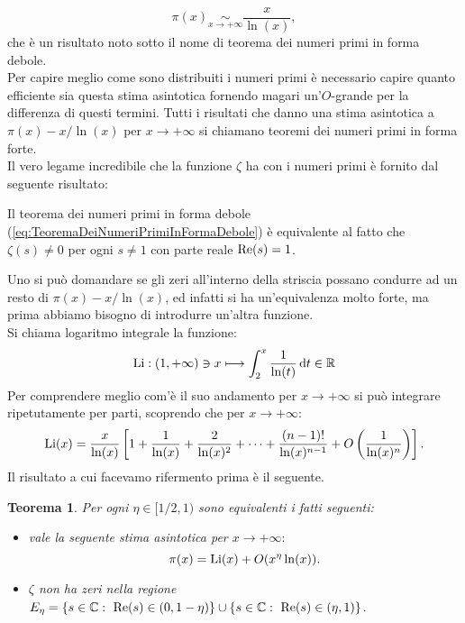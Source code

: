 \documentclass[11pt]{book}
\theoremstyle{Definizione}
\theoremstyle{TeoremaProposizioneLemmaCorollarioCongettura}
\newtheorem{myteo}{Teorema}[section]
\theoremstyle{OsservazioneNotaEsempio}
\newcommand{\R}{\mathbb{R}}
\newcommand{\C}{\mathbb{C}}
\renewcommand{\Re}{\textup{Re}}
\renewcommand{\d}{\mathrm{d}}
\newcommand{\dt}{\,\d t}
\begin{document}
\begin{equation}\label{eq:TeoremaDeiNumeriPrimiInFormaDebole}
\pi(x) \underset{x \to +\infty}{\sim} \frac{x}{\ln(x)},
\end{equation}
che è un risultato noto sotto il nome di teorema dei numeri primi in forma debole.\\
Per capire meglio come sono distribuiti i numeri primi è necessario capire quanto efficiente sia questa stima asintotica fornendo magari un'$O$-grande per la differenza di questi termini. Tutti i risultati che danno una stima asintotica a $\pi(x)-x/\ln(x)$ per $x \to +\infty$ si chiamano teoremi dei numeri primi in forma forte.\\
\noindent
Il vero legame incredibile che la funzione $\zeta$ ha con i numeri primi è fornito dal seguente risultato:
\begin{center}
Il teorema dei numeri primi in forma debole (\ref{eq:TeoremaDeiNumeriPrimiInFormaDebole}) è equivalente al fatto che $\zeta(s) \neq 0$ per ogni $s\neq 1$ con parte reale $\Re(s) = 1$.
\end{center}
Uno si può domandare se gli zeri all'interno della striscia possano condurre ad un resto di $\pi(x)-x/\ln(x)$, ed infatti si ha un'equivalenza molto forte, ma prima abbiamo bisogno di introdurre un'altra funzione.\\
\indent
Si chiama logaritmo integrale la funzione:
$$
\textup{Li}:(1,+\infty)\ni x \longmapsto \int_2^x \frac{1}{\ln(t)}\dt \in \R
$$
Per comprendere meglio com'è il suo andamento per $x \to +\infty$ si può integrare ripetutamente per parti, scoprendo che per $x \to +\infty$:
$$
\textup{Li}(x) = \frac{x}{\ln(x)}\left[1+\frac{1}{\ln(x)}+\frac{2}{\ln(x)^2}+\cdots + \frac{(n-1)!}{\ln(x)^{n-1}}+O\left(\frac{1}{\ln(x)^n}\right)\right].
$$
Il risultato a cui facevamo rifermento prima è il seguente.
\begin{boxteo}{}
\begin{myteo}
Per ogni $\eta \in [1/2,1)$ sono equivalenti i fatti seguenti:
\begin{itemize}
\item[$(i)$] vale la seguente stima asintotica per $x \to +\infty:$
$$
\pi(x) = \textup{Li}(x) + O(x^\eta\ln(x)).
$$
\item[$(ii)$] $\zeta$ non ha zeri nella regione $E_\eta = \{s\in \C:\ \Re(s)\in (0,1-\eta)\}\cup \{s\in \C:\ \Re(s)\in (\eta,1)\}$.
\end{itemize}
\end{myteo}
\end{boxteo}
\noindent
\end{document}

